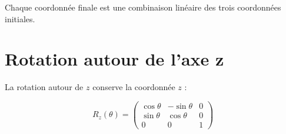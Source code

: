 \documentclass[11pt,a4paper]{article}
\newcommand{\sectiontitle}[1]{\section{#1}}
\begin{document}
\begin{importantbox}
Chaque coordonnée finale est une combinaison linéaire des trois
coordonnées initiales.
\end{importantbox}


\sectiontitle{Rotation autour de l'axe z}

La rotation autour de $z$ conserve la coordonnée $z$ :

\[
\boxed{
R_z(\theta)=
\begin{pmatrix}
\cos\theta&-\sin\theta&0\\
\sin\theta&\cos\theta&0\\
0&0&1
\end{pmatrix}}
\]
\end{document}

